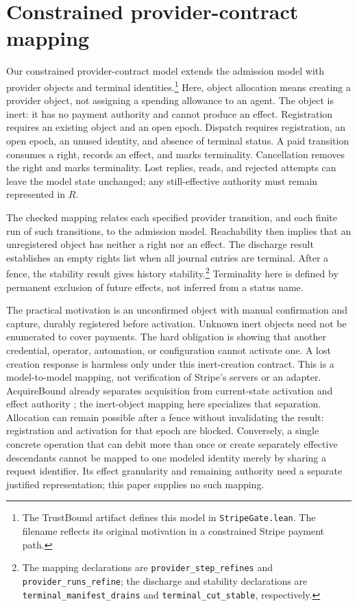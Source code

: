 \documentclass[11pt]{article}
\newcommand{\code}[1]{\texttt{\small #1}}
\begin{document}
\section{Constrained provider-contract mapping}
\label{sec:mapping}
Our constrained provider-contract model extends the admission model with
provider objects and terminal identities.\footnote{\raggedright The TrustBound artifact
defines this model in \code{StripeGate.lean}. The filename reflects its original
motivation in a constrained Stripe payment path.\par}
Here, object allocation means creating a provider object, not assigning a
spending allowance to an agent. The object is inert: it has no payment authority
and cannot produce an effect. Registration requires an existing object and an open epoch.
Dispatch requires registration, an open epoch, an unused identity, and absence
of terminal status. A paid transition consumes a right, records an effect,
and marks terminality. Cancellation removes the right and marks terminality.
Lost replies, reads, and rejected attempts can leave the model state unchanged;
any still-effective authority must remain represented in $R$.

The checked mapping relates each specified provider transition, and each finite
run of such transitions, to the admission model. Reachability then implies that
an unregistered object has neither a right nor an effect. The discharge result
establishes an empty rights list when all journal entries are terminal. After a
fence, the stability result gives history stability.\footnote{\raggedright The
mapping declarations are \code{provider\_step\_refines} and
\code{provider\_runs\_refine}; the discharge and stability declarations are
\code{terminal\_manifest\_drains} and \code{terminal\_cut\_stable}, respectively.\par}
Terminality here is defined by permanent exclusion of future effects, not
inferred from a status name.

The practical motivation is an unconfirmed object with manual confirmation
and capture, durably registered before activation. Unknown inert objects need
not be enumerated to cover payments. The hard obligation is showing that
another credential, operator, automation, or configuration cannot activate one.
A lost creation response is harmless only under this inert-creation contract.
This is a model-to-model mapping, not verification of Stripe's servers or an adapter. AcquireBound already
separates acquisition from current-state activation and effect authority
\cite{acquirebound}; the inert-object mapping here specializes that separation.
Allocation can remain possible after a fence without invalidating the result:
registration and activation for that epoch are blocked. Conversely, a single
concrete operation that can debit more than once or create separately effective
descendants cannot be mapped to one modeled identity merely by sharing a
request identifier. Its effect granularity and remaining authority need a
separate justified representation; this paper supplies no such mapping.
\end{document}
